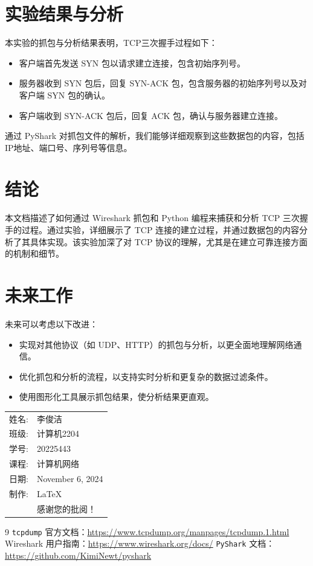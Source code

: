 \documentclass[12pt]{article}
\begin{document}
\section{实验结果与分析}
本实验的抓包与分析结果表明，TCP三次握手过程如下：
\begin{itemize}
    \item 客户端首先发送 SYN 包以请求建立连接，包含初始序列号。
    \item 服务器收到 SYN 包后，回复 SYN-ACK 包，包含服务器的初始序列号以及对客户端 SYN 包的确认。
    \item 客户端收到 SYN-ACK 包后，回复 ACK 包，确认与服务器建立连接。
\end{itemize}
通过 PyShark 对抓包文件的解析，我们能够详细观察到这些数据包的内容，包括IP地址、端口号、序列号等信息。

\section{结论}
本文档描述了如何通过 Wireshark 抓包和 Python 编程来捕获和分析 TCP 三次握手的过程。通过实验，详细展示了 TCP 连接的建立过程，并通过数据包的内容分析了其具体实现。该实验加深了对 TCP 协议的理解，尤其是在建立可靠连接方面的机制和细节。

\section{未来工作}
未来可以考虑以下改进：
\begin{itemize}
    \item 实现对其他协议（如 UDP、HTTP）的抓包与分析，以更全面地理解网络通信。
    \item 优化抓包和分析的流程，以支持实时分析和更复杂的数据过滤条件。
    \item 使用图形化工具展示抓包结果，使分析结果更直观。
\end{itemize}

\begin{flushright}
\begin{tabular}{rl}
    姓名: & 李俊洁\\
    班级: & 计算机2204 \\
    学号: & 20225443 \\
    课程: & 计算机网络 \\
    日期: & November 6, 2024 \\
    制作: & \LaTeX \\
    & 感谢您的批阅！
\end{tabular}
\end{flushright}

\begin{thebibliography}{9}
 \texttt{tcpdump} 官方文档：\url{https://www.tcpdump.org/manpages/tcpdump.1.html}
 Wireshark 用户指南：\url{https://www.wireshark.org/docs/}
 \texttt{PyShark} 文档：\url{https://github.com/KimiNewt/pyshark}
\end{thebibliography}
\end{document}
